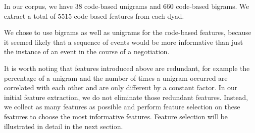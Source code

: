 \documentclass[11pt]{article} %
\begin{document}
In our corpus, we have 38 code-based unigrams and 660 code-based bigrams. We extract a total of 5515 code-based features from each dyad.

We chose to use bigrams as well as unigrams for the code-based features, because it seemed likely that a sequence of events would be more informative than just the instance of an event in the course of a negotiation.

It is worth noting that features introduced above are redundant, for example the percentage of a unigram and the number of times a unigram occurred are correlated with each other and are only different by a constant factor.  In our initial feature extraction, we do not eliminate those redundant features.  Instead, we collect as many features as possible and perform feature selection on these features to choose the most informative features. Feature selection will be illustrated in detail in the next section.
\end{document}

